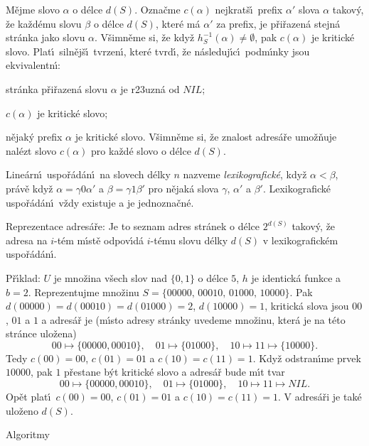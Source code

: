 \documentclass[a4paper,12pt]{article}
\begin{document}
\flushpar M\v ejme slovo $\alpha$ o d\'elce $d(S)$. Ozna\v cme $c
(\alpha )$ nejkrat\v s\'\i\ 
prefix $\alpha'$ slova $\alpha$ takov\'y, \v ze ka\v zd\'emu slovu $\beta$ o d\'elce $d(S)$, kter\'e m\'a $\alpha'$ 
za prefix, je p\v ri\v razen\'a stejn\'a str\'anka jako slovu $\alpha$. V\v simn\v eme si, \v ze kdy\v z $h^{
-1}_S(\alpha )\ne\emptyset$, pak $c(\alpha )$ je 
kritick\'e slovo. Plat\'\i\ siln\v ej\v s\'\i\ tvrzen\'\i , kter\'e tvrd\'\i , \v ze 
n\'asleduj\'\i c\'\i\ podm\'\i nky jsou ekvivalentn\'\i :
\roster
\item
str\'anka p\v ri\v razen\'a slovu $\alpha$ je r\accent23uzn\'a od $
NIL$;
\item
$c(\alpha )$ je kritick\'e slovo;
\item
n\v ejak\'y prefix $\alpha$ je kritick\'e slovo.
\endroster
V\v simn\v eme si, \v ze znalost adres\'a\v re umo\v z\v nuje nal\'ezt slovo 
$c(\alpha )$ pro ka\v zd\'e slovo o d\'elce $d(S)$.
\medskip

\flushpar Line\'arn\'\i\ uspo\v r\'ad\'an\'\i\ na slovech d\'elky $
n$ nazveme 
\emph{lexikografick\'e}, kdy\v z $\alpha <\beta$, pr\'av\v e kdy\v z 
$\alpha =\gamma 0\alpha'$ a $\beta =\gamma 1\beta'$ pro n\v ejak\'a slova $
\gamma$, $\alpha'$ a $\beta'$. 
Lexikografick\'e uspo\v r\'ad\'an\'\i\ v\v zdy existuje a je 
jednozna\v cn\'e.
\medskip

\flushpar Reprezentace adres\'a\v re: Je to seznam adres 
str\'anek o d\'elce $2^{d(S)}$ takov\'y, \v ze adresa na $i$-t\'em m\'\i st\v e 
odpov\'\i d\'a $i$-t\'emu slovu d\'elky $d(S)$ v lexikografick\'em 
uspo\v r\'ad\'an\'\i .

\flushpar P\v r\'\i klad: $U$ je mno\v zina v\v sech slov nad $\{
0,1\}$ o 
d\'elce $5$, $h$ 
je identick\'a funkce a $b=2$. Reprezentujme mno\v zinu  
$S=\{00000,\,00010,\,01000,\,10000\}$. Pak 
$d(00000)=d(00010)=d(01000)=2$, $d(10000)=1$, kritick\'a slova 
jsou $00$, $01$ a $1$ a adres\'a\v r je (m\'\i sto adresy str\'anky 
uvedeme mno\v zinu, kter\'a je na t\'eto str\'ance ulo\v zena)
$$00\mapsto \{00000,00010\},\quad 01\mapsto \{01000\},\quad 10\mapsto 
11\mapsto \{10000\}.$$
Tedy $c(00)=00$, $c(01)=01$ a $c(10)=c(11)=1$.
Kdy\v z odstran\'\i me prvek $10000$, pak $1$ p\v restane b\'yt kritick\'e 
slovo a adres\'a\v r bude m\'\i t tvar
$$00\mapsto \{00000,00010\},\quad 01\mapsto \{01000\},\quad 10\mapsto 
11\mapsto NIL.$$
Op\v et plat\'\i\ $c(00)=00$, $c(01)=01$ a $c(10)=c(11)=1$.
V adres\'a\v ri je tak\'e ulo\v zeno $d(S)$.
\medskip

\subhead
Algoritmy
\endsubhead
\bigskip
\end{document}
